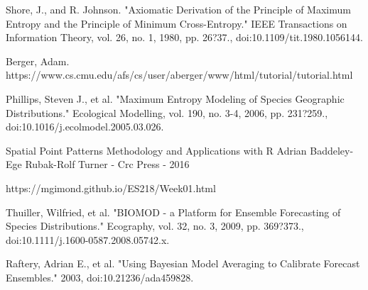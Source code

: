 \noindent [10]  Shore, J., and R. Johnson. 
"Axiomatic Derivation of the Principle of Maximum Entropy and the Principle of Minimum Cross-Entropy." 
IEEE Transactions on Information Theory, vol. 26, no. 1, 1980, pp. 26?37.,
doi:10.1109/tit.1980.1056144. \newline

\noindent [11] Berger, Adam. \newline 
https://www.cs.cmu.edu/afs/cs/user/aberger/www/html/tutorial/tutorial.html\newline

\noindent [12] Phillips, Steven J., et al. 
"Maximum Entropy Modeling of Species Geographic Distributions."
Ecological Modelling, vol. 190, no. 3-4, 2006, pp. 231?259.,\newline
doi:10.1016/j.ecolmodel.2005.03.026. \newline

\noindent[13] Spatial Point Patterns Methodology and Applications with R
Adrian Baddeley-Ege Rubak-Rolf Turner - Crc Press - 2016 \newline

\noindent [14] https://mgimond.github.io/ES218/Week01.html \newline

\noindent [15] Thuiller, Wilfried, et al. "BIOMOD - a Platform for Ensemble Forecasting 
of Species Distributions." Ecography, vol. 32, no. 3, 2009, pp. 369?373.,
doi:10.1111/j.1600-0587.2008.05742.x. \newline
 
 \noindent [16] Raftery, Adrian E., et al. 
"Using Bayesian Model Averaging to Calibrate Forecast Ensembles." 2003,
 doi:10.21236/ada459828.
 
 
 
 